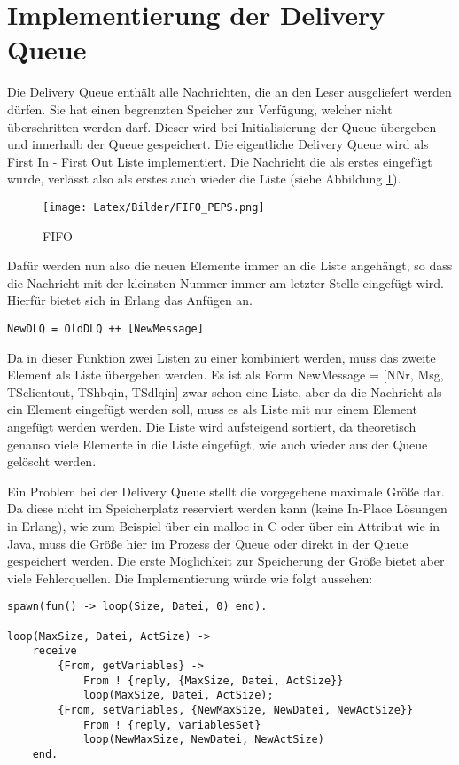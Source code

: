 \section{Implementierung der Delivery Queue} \label{dlq}

Die Delivery Queue enthält alle Nachrichten, die an den Leser ausgeliefert werden dürfen. Sie hat einen begrenzten Speicher zur Verfügung, welcher nicht überschritten werden darf. Dieser wird bei Initialisierung der Queue übergeben und innerhalb der Queue gespeichert. Die eigentliche Delivery Queue wird als First In - First Out Liste implementiert. Die Nachricht die als erstes eingefügt wurde, verlässt also als erstes auch wieder die Liste (siehe Abbildung \ref{fig:fifo}).

\begin{figure}[htbp]
\begin{center}
\texttt{[image: Latex/Bilder/FIFO\_PEPS.png]}
\caption[First In First Out]{FIFO\footnotemark}\label{fig:fifo}
\end{center}
\end{figure}

Dafür werden nun also die neuen Elemente immer an die Liste angehängt, so dass die Nachricht mit der kleinsten Nummer immer am letzter Stelle eingefügt wird. Hierfür bietet sich in Erlang das Anfügen an. 

\begin{lstlisting}
NewDLQ = OldDLQ ++ [NewMessage]
\end{lstlisting}

Da in dieser Funktion zwei Listen zu einer kombiniert werden, muss das zweite Element als Liste übergeben werden. Es ist als Form NewMessage = [NNr, Msg, TSclientout, TShbqin, TSdlqin] zwar schon eine Liste, aber da die Nachricht als ein Element eingefügt werden soll, muss es als Liste mit nur einem Element angefügt werden werden. 
Die Liste wird aufsteigend sortiert, da theoretisch genauso viele Elemente in die Liste eingefügt, wie auch wieder aus der Queue gelöscht werden. 

Ein Problem bei der Delivery Queue stellt die vorgegebene maximale Größe dar. Da diese nicht im Speicherplatz reserviert werden kann (keine In-Place Lösungen in Erlang), wie zum Beispiel über ein malloc in C oder über ein Attribut wie in Java, muss die Größe hier im Prozess der Queue oder direkt in der Queue gespeichert werden.
Die erste Möglichkeit zur Speicherung der Größe bietet aber viele Fehlerquellen. Die Implementierung würde wie folgt aussehen:
\begin{lstlisting}
spawn(fun() -> loop(Size, Datei, 0) end).

loop(MaxSize, Datei, ActSize) -> 
    receive 
        {From, getVariables} -> 
            From ! {reply, {MaxSize, Datei, ActSize}}
            loop(MaxSize, Datei, ActSize);
        {From, setVariables, {NewMaxSize, NewDatei, NewActSize}}
            From ! {reply, variablesSet}
            loop(NewMaxSize, NewDatei, NewActSize)
    end.
\end{lstlisting}

